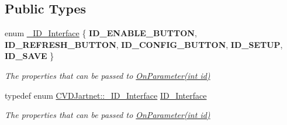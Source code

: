 \subsection*{Public Types}
\begin{DoxyCompactItemize}
\item 
\mbox{\label{classCVDJartnet_a21c2dd92432ebdc24fdfe9d6f4fdb304}} 
enum \hyperlink{classCVDJartnet_a21c2dd92432ebdc24fdfe9d6f4fdb304}{\+\_\+\+I\+D\+\_\+\+Interface} \{ \newline
{\bfseries I\+D\+\_\+\+E\+N\+A\+B\+L\+E\+\_\+\+B\+U\+T\+T\+ON}, 
{\bfseries I\+D\+\_\+\+R\+E\+F\+R\+E\+S\+H\+\_\+\+B\+U\+T\+T\+ON}, 
{\bfseries I\+D\+\_\+\+C\+O\+N\+F\+I\+G\+\_\+\+B\+U\+T\+T\+ON}, 
{\bfseries I\+D\+\_\+\+S\+E\+T\+UP}, 
\newline
{\bfseries I\+D\+\_\+\+S\+A\+VE}
 \}\begin{DoxyCompactList}\small\item\em The properties that can be passed to \hyperlink{classCVDJartnet_a7acdd06e91ab522c8a5facddc4a58e43}{On\+Parameter(int id)} \end{DoxyCompactList}
\item 
\mbox{\label{classCVDJartnet_a932dbf4dc412424e9349a298ee1f4363}} 
typedef enum \hyperlink{classCVDJartnet_a21c2dd92432ebdc24fdfe9d6f4fdb304}{C\+V\+D\+Jartnet\+::\+\_\+\+I\+D\+\_\+\+Interface} \hyperlink{classCVDJartnet_a932dbf4dc412424e9349a298ee1f4363}{I\+D\+\_\+\+Interface}
\begin{DoxyCompactList}\small\item\em The properties that can be passed to \hyperlink{classCVDJartnet_a7acdd06e91ab522c8a5facddc4a58e43}{On\+Parameter(int id)} \end{DoxyCompactList}\end{DoxyCompactItemize}
